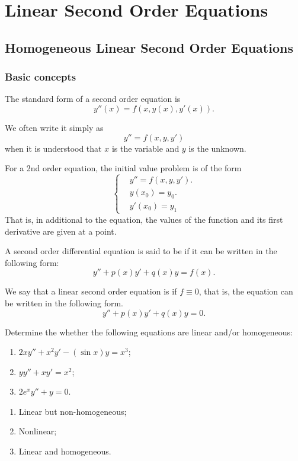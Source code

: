 \chapter{Linear Second Order Equations}

\section{Homogeneous Linear Second Order Equations}

\subsection{Basic concepts}
The standard form of a second order equation is 
\[y''(x) = f(x,y(x),y'(x)).\]

We often write it simply as 
\[y''= f(x,y,y')\]
when it is understood that $x$ is the variable and $y$ is the unknown.

For a 2nd order equation, the initial value problem is of the form
\[
  \begin{cases}
    & y''= f(x,y,y').\\
    & y(x_0)   =   y_0.\\
    & y'(x_0) = y_1
  \end{cases}
\]
That is, in additional to the equation, the values of the function and its first derivative are given at a point.

A second order differential equation is said to be  if it can be written in the following form:
\[y'' + p(x) y' + q(x) y = f(x).\]

We say that a linear second order equation is  if $f\equiv0$, that is, the equation can be written in the following form.
\[y'' + p(x) y' + q(x) y = 0.\]

\begin{example}
Determine the whether the following equations are linear and/or homogeneous: 
\begin{enumerate}
	\item $2xy''+x^2y'-(\sin x)y=x^3$;  
	\item $yy''+xy'=x^2$;
	\item $2e^xy''+y=0$.
\end{enumerate}  
\end{example}
\begin{solution}
  \begin{enumerate}
    \item Linear but non-homogeneous;
    \item Nonlinear;
    \item Linear and homogeneous.
  \end{enumerate}	
\end{solution}

